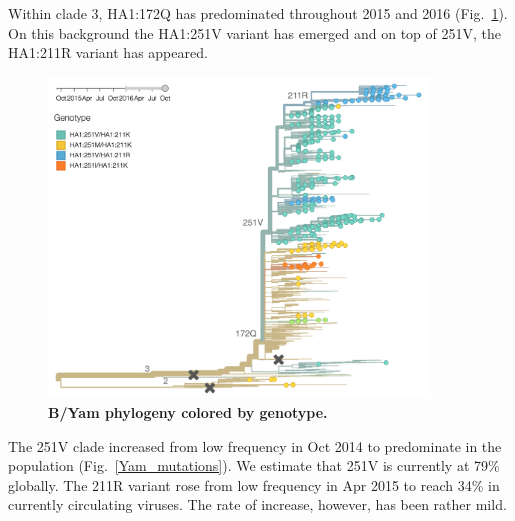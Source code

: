 \documentclass[11pt,oneside,letterpaper]{article}
\begin{document}
Within clade 3, HA1:172Q has predominated throughout 2015 and 2016 (Fig.\ \ref{Yam_tree}). On this background the HA1:251V variant has emerged and on top of 251V, the HA1:211R variant has appeared.

\begin{figure}[H]
	\centering
	\includegraphics[width=0.9\textwidth]{../figures/sep-2016/Yam_tree.png}
	\caption{\textbf{B/Yam phylogeny colored by genotype.}
	}
	\label{Yam_tree}
\end{figure}

\pagebreak

The 251V clade increased from low frequency in Oct 2014 to predominate in the population (Fig.\ \ref{Yam_mutations}). We estimate that 251V is currently at 79\% globally. The 211R variant rose from low frequency in Apr 2015 to reach 34\% in currently circulating viruses. The rate of increase, however, has been rather mild.
\end{document}
